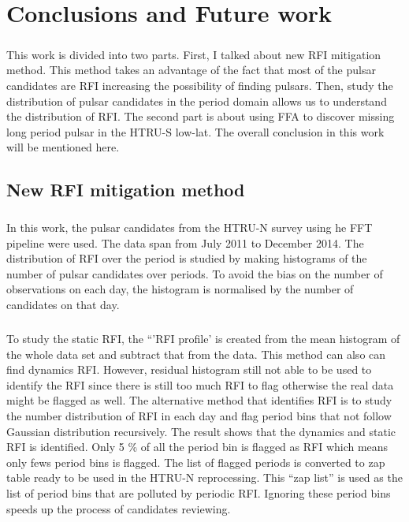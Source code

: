 \documentclass[../chapter1/thesis_msc.tex]{subfiles}
\begin{document}
\chapter{Conclusions and Future work} \label{Con}
\paragraph{} This work is divided into two parts. First, I talked about new RFI mitigation method. This method takes an advantage of the fact that most of the pulsar candidates are RFI increasing the possibility of finding pulsars. Then, study the distribution of pulsar candidates in the period domain allows us to understand the distribution of RFI. The second part is about using FFA to discover missing long period pulsar in the HTRU-S low-lat. The overall conclusion in this work will be mentioned here. 
\section{New RFI mitigation method}
\paragraph{} In this work, the pulsar candidates from the HTRU-N survey using he FFT pipeline were used. The data span from July 2011 to December 2014. The distribution of RFI over the period is studied by making histograms of the number of pulsar candidates over periods. To avoid the bias on the number of observations on each day, the histogram is normalised by the number of candidates on that day.
\paragraph{} To study the static RFI, the ``'RFI profile' is created from the mean histogram of the whole data set and subtract that from the data. This method can also can 
find dynamics RFI. However, residual histogram still not able to be used to identify the RFI since there is still too much RFI to flag otherwise the real data might be flagged as well. The alternative method that identifies RFI is to study the number distribution of RFI in each day and flag period bins that not follow Gaussian distribution recursively. The result shows that the dynamics and static RFI is identified. Only 5 \% of all the period bin is flagged as RFI which means only fews period bins is flagged. The list of flagged periods is converted to zap table ready to be used in the HTRU-N reprocessing. This ``zap list'' is used as the list of period bins that are polluted by periodic RFI. Ignoring these period bins speeds up the process of candidates reviewing.  
\end{document}
